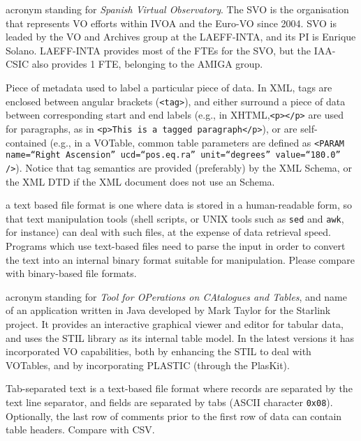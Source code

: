 {
    	acronym standing for \emph{Spanish Virtual Observatory}. The
        SVO is the organisation that represents VO efforts within
        \gls{IVOA} and the \gls{Euro-VO} since 2004. SVO is leaded by
        the VO and Archives group at the \gls{LAEFF-INTA}, and its PI
        is Enrique Solano. LAEFF-INTA provides most of the FTEs for the
        SVO, but the \gls{IAA-CSIC} also provides 1 FTE, belonging to
        the \gls{AMIGA} group.
}

{
    	Piece of metadata used to label a particular piece of data. In
        \gls{XML}, tags are enclosed between angular brackets
        (\texttt{<tag>}), and either surround a piece of data between
        corresponding start and end labels (e.g., in
        \gls{XHTML},\texttt{<p></p>} are used for paragraphs, as in
        \texttt{<p>This is a tagged paragraph</p>}), or are
        self-contained (e.g., in a \gls{VOTable}, common table
        parameters are defined as \texttt{<PARAM name=``Right
        Ascension'' ucd=``pos.eq.ra'' unit=``degrees'' value=``180.0''
        />}). Notice that tag semantics are provided (preferably) by
        the XML Schema, or the XML DTD if the XML document does not use
        an Schema.
}

{
    	a text based file format is one where data is stored in a
        human-readable form, so that text manipulation tools (shell
        scripts, or UNIX tools such as \texttt{sed} and \texttt{awk},
		for
        instance) can deal with such files, at the expense of data
        retrieval speed. Programs which use text-based files need to
        parse the input in order to convert the text into an internal
        binary format suitable for manipulation. Please compare with
        \gls{binary-based file formats}.
}

{
    	acronym standing for \emph{Tool for OPerations on CAtalogues
        and Tables}, and name of an application written in \gls{Java}
        developed by Mark Taylor for the \gls{Starlink project}. It
        provides an interactive graphical viewer and editor for tabular
        data, and uses the \gls{STIL} library as its internal table
        model. In the latest versions it has incorporated \gls{VO}
        capabilities, both by enhancing the STIL to deal with
        \gls{VOTables}, and by incorporating \gls{PLASTIC} (through the
        \gls{PlasKit}).
}

{
    	Tab-separated text is a \gls{text-based file format} where
        records are separated by the text line separator, and fields
        are separated by tabs (\gls{ASCII} character \texttt{0x08}).
        Optionally, the last row of comments prior to the first row of
        data can contain table headers. Compare with \gls{CSV}.
}

